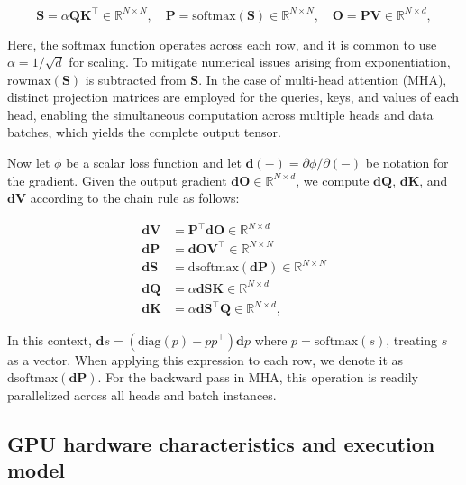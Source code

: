 \begin{equation*}
  \mathbf{S} = \alpha \mathbf{Q} \mathbf{K}^\top \in \mathbb{R}^{N \times N}, \quad \mathbf{P} = \mathrm{softmax}(\mathbf{S}) \in \mathbb{R}^{N \times N}, \quad \mathbf{O} = \mathbf{P}\mathbf{V} \in \mathbb{R}^{N \times d},
\end{equation*}

Here, the $\mathrm{softmax}$ function operates across each row, and it is common to use $\alpha = 1/\sqrt{d}$ for scaling. To mitigate numerical issues arising from exponentiation, $\mathrm{rowmax}(\mathbf{S})$ is subtracted from $\mathbf{S}$. In the case of multi-head attention (MHA), distinct projection matrices are employed for the queries, keys, and values of each head, enabling the simultaneous computation across multiple heads and data batches, which yields the complete output tensor.

Now let $\phi$ be a scalar loss function and let $\mathbf{d}(-) = \partial \phi / \partial (-)$ be notation for the gradient. Given the output gradient $\mathbf{dO} \in \mathbb{R}^{N \times d}$, we compute $\mathbf{dQ}$, $\mathbf{dK}$, and $\mathbf{dV}$ according to the chain rule as follows:

\begin{align*}
  \mathbf{dV} &= \mathbf{P}^\top \mathbf{dO} \in \mathbb{R}^{N \times d} \\
  \mathbf{dP} &= \mathbf{dO} \mathbf{V}^\top \in \mathbb{R}^{N \times N} \\
  \mathbf{dS} &= \mathrm{dsoftmax} (\mathbf{dP}) \in \mathbb{R}^{N \times N} \\
  \mathbf{dQ} &= \alpha \mathbf{dS} \mathbf{K} \in \mathbb{R}^{N \times d} \\
  \mathbf{dK} &= \alpha \mathbf{dS}^\top \mathbf{Q} \in \mathbb{R}^{N \times d},
\end{align*}

In this context, $\mathbf{d}s = (\mathrm{diag}(p) - p p^\top)\mathbf{d}p$ where $p = \mathrm{softmax}(s)$, treating $s$ as a vector. When applying this expression to each row, we denote it as $\mathrm{dsoftmax}(\mathbf{dP})$. For the backward pass in MHA, this operation is readily parallelized across all heads and batch instances.

\subsection{GPU hardware characteristics and execution model}
\label{subsec:hardware}

